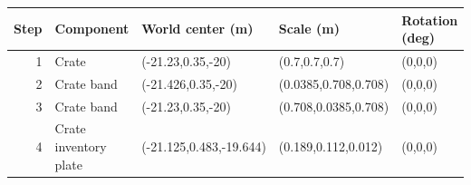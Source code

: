 \begin{center}\scriptsize\begin{tabular}{rllll}\toprule
Step & Component & World center (m) & Scale (m) & Rotation (deg) \\\midrule
1 & Crate & (-21.23,0.35,-20) & (0.7,0.7,0.7) & (0,0,0) \\
2 & Crate band & (-21.426,0.35,-20) & (0.0385,0.708,0.708) & (0,0,0) \\
3 & Crate band & (-21.23,0.35,-20) & (0.708,0.0385,0.708) & (0,0,0) \\
4 & Crate inventory plate & (-21.125,0.483,-19.644) & (0.189,0.112,0.012) & (0,0,0) \\
\bottomrule\end{tabular}\end{center}
